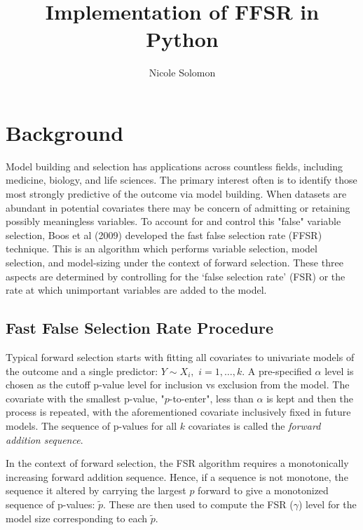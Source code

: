 \documentclass[12pt]{article}
\begin{document}
\title{Implementation of FFSR in Python}
\author{Nicole Solomon}
\maketitle

\vspace{8mm}

\section{Background}

Model building and selection has applications across countless fields, including medicine, biology, and life sciences.  The 
primary interest often is to identify those most strongly predictive of the outcome via model building.  When datasets are 
abundant in potential covariates there may be concern of admitting or retaining possibly meaningless variables.  To account 
for and control this "false" variable selection, Boos et al (2009) developed the fast false selection rate (FFSR) technique.  
This is an algorithm which performs variable selection, model selection, and model-sizing under the context of forward 
selection. These three aspects are determined by controlling for the `false selection rate' (FSR) or the rate at which 
unimportant variables are added to the model.

\subsection{Fast False Selection Rate Procedure}

Typical forward selection starts with fitting all covariates to univariate models of the outcome and a single predictor: $Y 
\sim X_i,$ $i = 1,\ldots,k$.  A pre-specified $\alpha$ level is chosen as the cutoff p-value level for inclusion vs 
exclusion from the model.  The covariate with the smallest p-value, "$p$-to-enter", less than $\alpha$ is kept and then the 
process is repeated, with the aforementioned covariate inclusively fixed in future models.  The sequence of p-values for all 
$k$ covariates is called the \textit{forward addition sequence}.

In the context of forward selection, the FSR algorithm requires a monotonically increasing forward addition sequence.  Hence, 
if a sequence is not monotone, the sequence it altered by carrying the largest $p$ forward to give a monotonized sequence of 
p-values: $\tilde{p}.$  These are then used to compute the FSR ($\gamma$) level for the model size corresponding to each 
$\tilde{p}.$
\end{document}
